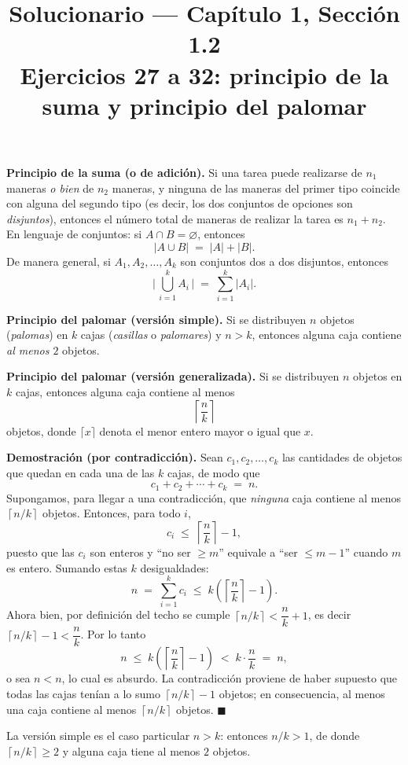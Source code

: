 \documentclass[11pt]{article}
\title{Solucionario --- Cap\'itulo 1, Secci\'on 1.2\\ Ejercicios 27 a 32: principio de la suma y principio del palomar}
\author{}
\date{}
\begin{document}
\maketitle

\begin{teo}
\textbf{Principio de la suma (o de adici\'on).} Si una tarea puede realizarse de $n_1$ maneras \emph{o bien} de $n_2$ maneras, y ninguna de las maneras del primer tipo coincide con alguna del segundo tipo (es decir, los dos conjuntos de opciones son \emph{disjuntos}), entonces el n\'umero total de maneras de realizar la tarea es $n_1+n_2$. En lenguaje de conjuntos: si $A\cap B=\varnothing$, entonces
\[
|A\cup B| \;=\; |A|+|B|.
\]
De manera general, si $A_1,A_2,\dots,A_k$ son conjuntos dos a dos disjuntos, entonces
\[
\Big|\,\bigcup_{i=1}^{k}A_i\,\Big| \;=\; \sum_{i=1}^{k}|A_i|.
\]

\medskip
\textbf{Principio del palomar (versi\'on simple).} Si se distribuyen $n$ objetos (\emph{palomas}) en $k$ cajas (\emph{casillas} o \emph{palomares}) y $n>k$, entonces alguna caja contiene \emph{al menos $2$} objetos.

\medskip
\textbf{Principio del palomar (versi\'on generalizada).} Si se distribuyen $n$ objetos en $k$ cajas, entonces alguna caja contiene al menos
\[
\left\lceil \frac{n}{k} \right\rceil
\]
objetos, donde $\lceil x\rceil$ denota el menor entero mayor o igual que $x$.

\medskip
\textbf{Demostraci\'on (por contradicci\'on).} Sean $c_1,c_2,\dots,c_k$ las cantidades de objetos que quedan en cada una de las $k$ cajas, de modo que
\[
c_1+c_2+\cdots+c_k \;=\; n .
\]
Supongamos, para llegar a una contradicci\'on, que \emph{ninguna} caja contiene al menos $\left\lceil n/k \right\rceil$ objetos. Entonces, para todo $i$,
\[
c_i \;\le\; \left\lceil \frac{n}{k} \right\rceil - 1 ,
\]
puesto que las $c_i$ son enteros y ``no ser $\ge m$'' equivale a ``ser $\le m-1$'' cuando $m$ es entero. Sumando estas $k$ desigualdades:
\[
n \;=\; \sum_{i=1}^{k} c_i \;\le\; k\left(\left\lceil \frac{n}{k}\right\rceil-1\right).
\]
Ahora bien, por definici\'on del techo se cumple $\left\lceil n/k\right\rceil < \dfrac{n}{k}+1$, es decir $\left\lceil n/k\right\rceil-1 < \dfrac{n}{k}$. Por lo tanto
\[
n \;\le\; k\left(\left\lceil \frac{n}{k}\right\rceil-1\right) \;<\; k\cdot\frac{n}{k} \;=\; n,
\]
o sea $n<n$, lo cual es absurdo. La contradicci\'on proviene de haber supuesto que todas las cajas ten\'ian a lo sumo $\left\lceil n/k\right\rceil-1$ objetos; en consecuencia, al menos una caja contiene al menos $\left\lceil n/k\right\rceil$ objetos. $\blacksquare$

\medskip
La versi\'on simple es el caso particular $n>k$: entonces $n/k>1$, de donde $\left\lceil n/k\right\rceil\ge 2$ y alguna caja tiene al menos $2$ objetos.
\end{teo}
\end{document}
